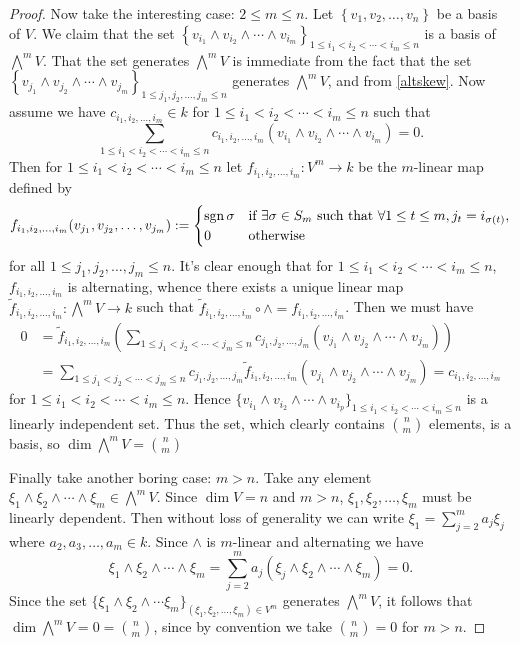\begin{pro}
\begin{proof}
Now take the interesting case: $2 \le m \le n$. Let $\left\{v_1,v_2,\ldots,v_n\right\}$ be a basis of $V$. We claim that the set $\left\{v_{i_1} \wedge v_{i_2} \wedge \cdots \wedge v_{i_m}\right\}_{1 \le i_1 < i_2 < \cdots < i_m \le n}$ is a basis of $\bigwedge^m V$. That the set generates $\bigwedge^m V$ is immediate from the fact that the set $\left\{v_{j_1} \wedge v_{j_2} \wedge \cdots \wedge v_{j_m}\right\}_{1 \le j_1, j_2, \ldots, j_m \le n}$ generates $\bigwedge^m V$, and from \ref{altskew}. Now assume we have $c_{i_1,i_2,\ldots,i_m} \in k$ for $1 \le i_1 < i_2 < \cdots < i_m \le n$ such that \[ \sum_{1 \le i_1 < i_2 < \cdots < i_m \le n} c_{i_1,i_2,\ldots,i_m}(v_{i_1} \wedge v_{i_2} \wedge \cdots \wedge v_{i_m}) = 0.\] Then for  $1 \le i_1 < i_2 < \cdots < i_m \le n$ let $f_{i_1,i_2,\ldots,i_m} : V^m \to k$ be the $m$-linear map defined by
\[ f_{i_1,i_2,\ldots,i_m}(v_{j_1},v_{j_2},\ldots,v_{j_m}) := \begin{cases} \sgn \sigma & \text{if}\ \exists\sigma \in S_m\ \text{such that}\ \forall 1 \le t \le m, j_t = i_{\sigma(t)}, \\ 0 & \text{otherwise} \end{cases} \] 
for all $1 \le j_1,j_2,\ldots,j_m \le n$. It's clear enough that for $1 \le i_1 < i_2 < \cdots < i_m \le n$, $f_{i_1,i_2,\ldots,i_m}$ is alternating, whence there exists a unique linear map $\tilde f_{i_1,i_2,\ldots,i_m} : \bigwedge^m V \to k$ such that $\tilde f_{i_1,i_2,\ldots,i_m} \circ \wedge = f_{i_1,i_2,\ldots,i_m}$. Then we must have
\begin{align*}
  0 &= \tilde f_{i_1,i_2,\ldots,i_m}\left(\sum_{1 \le j_1 < j_2 < \cdots < j_m \le n} c_{j_1,j_2,\ldots,j_m}(v_{j_1} \wedge v_{j_2} \wedge \cdots \wedge v_{j_m})\right) \\ &=  \sum_{1 \le j_1 < j_2 < \cdots < j_m \le n} c_{j_1,j_2,\ldots,j_m}\tilde f_{i_1,i_2,\ldots,i_m} (v_{j_1} \wedge v_{j_2} \wedge \cdots \wedge v_{j_m}) = c_{i_1,i_2,\ldots,i_m}
\end{align*}
for $1 \le i_1 < i_2 < \cdots < i_m \le n$. Hence $\big\{v_{i_1} \wedge v_{i_2} \wedge \cdots \wedge v_{i_p}\big\}_{1 \le i_1 < i_2 < \cdots < i_m \le n}$ is a linearly independent set. Thus the set, which clearly contains $\binom nm$ elements, is a basis, so $\dim \bigwedge^m V = \binom nm$

Finally take another boring case: $m > n$. Take any element $\xi_1 \wedge \xi_2 \wedge \cdots \wedge \xi_m \in \bigwedge^m V$. Since $\dim V = n$ and $m > n$, $\xi_1,\xi_2,\ldots,\xi_m$ must be linearly dependent. Then without loss of generality we can write $\xi_1 = \sum_{j=2}^m a_j\xi_j$ where $a_2,a_3,\ldots,a_m \in k$. Since $\wedge$ is $m$-linear and alternating we have 
\[ \xi_1 \wedge \xi_2 \wedge \cdots \wedge \xi_m = \sum_{j=2}^m a_j (\xi_j \wedge \xi_2 \wedge \cdots \wedge \xi_m) = 0. \]
Since the set $\big\{\xi_1 \wedge \xi_2 \wedge \cdots \xi_m\big\}_{(\xi_1,\xi_2,\ldots,\xi_m) \in V^m}$ generates $\bigwedge^m V$, it follows that $\dim \bigwedge^m V = 0 = \binom nm$, since by convention we take $\binom nm = 0$ for $m > n$.
  \end{proof}
\end{pro}

